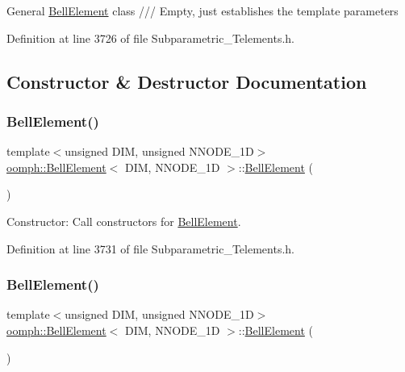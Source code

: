 General \hyperlink{classoomph_1_1BellElement}{Bell\+Element} class /// Empty, just establishes the template parameters 

Definition at line 3726 of file Subparametric\+\_\+\+Telements.\+h.



\subsection{Constructor \& Destructor Documentation}
\mbox{\label{classoomph_1_1BellElement_aa5c3a8bc5c7b87ce5ee6fdb6b4281180}} 
\subsubsection{\texorpdfstring{Bell\+Element()}{BellElement()}\hspace{0.1cm}{\footnotesize\ttfamily [1/2]}}
{\footnotesize\ttfamily template$<$unsigned D\+IM, unsigned N\+N\+O\+D\+E\+\_\+1D$>$ \\
\hyperlink{classoomph_1_1BellElement}{oomph\+::\+Bell\+Element}$<$ D\+IM, N\+N\+O\+D\+E\+\_\+1D $>$\+::\hyperlink{classoomph_1_1BellElement}{Bell\+Element} (\begin{DoxyParamCaption}{ }\end{DoxyParamCaption})\hspace{0.3cm}{\ttfamily [inline]}}



Constructor\+: Call constructors for \hyperlink{classoomph_1_1BellElement}{Bell\+Element}. 



Definition at line 3731 of file Subparametric\+\_\+\+Telements.\+h.

\mbox{\label{classoomph_1_1BellElement_aa6f76e5cba1c201863b6d45693629c2f}} 
\subsubsection{\texorpdfstring{Bell\+Element()}{BellElement()}\hspace{0.1cm}{\footnotesize\ttfamily [2/2]}}
{\footnotesize\ttfamily template$<$unsigned D\+IM, unsigned N\+N\+O\+D\+E\+\_\+1D$>$ \\
\hyperlink{classoomph_1_1BellElement}{oomph\+::\+Bell\+Element}$<$ D\+IM, N\+N\+O\+D\+E\+\_\+1D $>$\+::\hyperlink{classoomph_1_1BellElement}{Bell\+Element} (\begin{DoxyParamCaption}\item[{const \hyperlink{classoomph_1_1BellElement}{Bell\+Element}$<$ D\+IM, N\+N\+O\+D\+E\+\_\+1D $>$ \&}]{ }\end{DoxyParamCaption})\hspace{0.3cm}{\ttfamily [inline]}}



